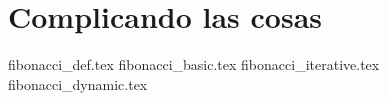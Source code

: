 \section{Complicando las cosas}
  \label{sec:Complicando_las_cosas}

  {fibonacci_def.tex}
  {fibonacci_basic.tex}
  {fibonacci_iterative.tex}
  {fibonacci_dynamic.tex}